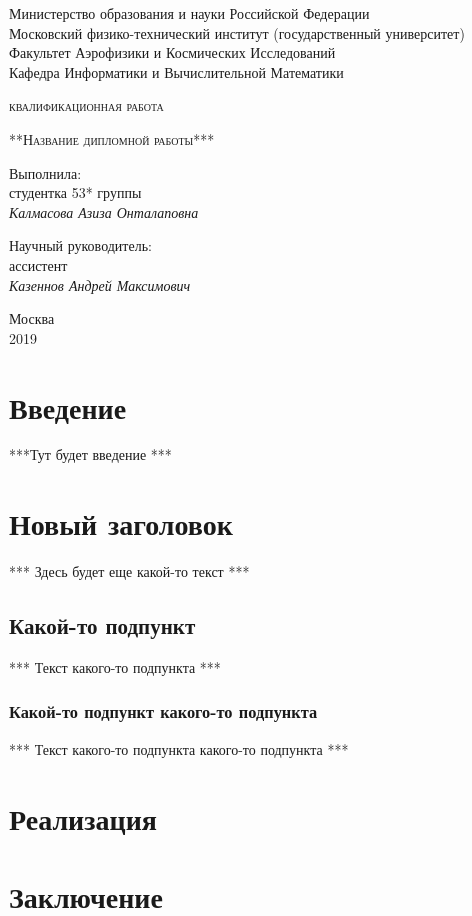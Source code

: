 \documentclass[a4paper,12pt]{article}
\numberwithin{equation}{section}%
\begin{document}
\begin{titlepage}
	\centering
	{Министерство образования и науки Российской Федерации\\
	Московский физико-технический институт (государственный университет)
	\\Факультет Аэрофизики и Космических Исследований
	\\Кафедра Информатики и Вычислительной Математики\par}
	\vspace{4 cm}
	{\scshape{} квалификационная работа \par}
	\vspace{2 cm}
	{\scshape\Large***Название дипломной работы***\par}
	\vfill
	\raggedleft
	{Выполнила:\\
	студентка 53* группы\\
	\itshape Калмасова Азиза Онталаповна\par}
	{Научный руководитель:\\
	ассистент\\
	\itshape Казеннов Андрей Максимович\par}
	\vfill
	\centering
	{\large Москва\\
	2019\par}
\end{titlepage}

\tableofcontents
\newpage
\section{Введение}

***Тут будет введение ***

\newpage
\section{Новый заголовок}

*** Здесь будет еще какой-то текст ***

\subsection{Какой-то подпункт}

*** Текст какого-то подпункта ***

\subsubsection{Какой-то подпункт какого-то подпункта}

*** Текст какого-то подпункта какого-то подпункта ***

\newpage
\section{Реализация}

\section{Заключение}

\newpage

\renewcommand{\refname}{Список литературы}
\begin{thebibliography}{99}


\end{thebibliography}
\end{document}
